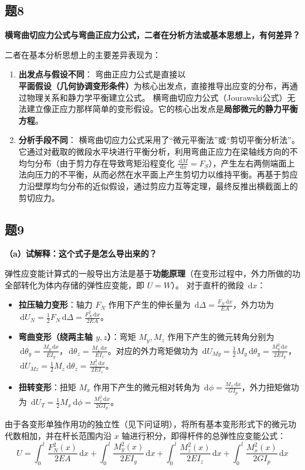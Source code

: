 \documentclass[UTF8,fontset=windows]{ctexart}
\newcommand{\diff}{\,\mathrm{d}}
\begin{document}
\subsection*{题8}
\textbf{横弯曲切应力公式与弯曲正应力公式，二者在分析方法或基本思想上，有何差异？}

二者在基本分析思想上的主要差异表现为：
\begin{enumerate}
    \item \textbf{出发点与假设不同}：
          弯曲正应力公式是直接以\textbf{平面假设（几何协调变形条件）}为核心出发点，直接推导出应变的分布，再通过物理关系和静力学平衡建立公式。
          横弯曲切应力公式（Jourawski公式）无法建立像正应力那样简单的变形假设。它的核心出发点是\textbf{局部微元的静力平衡方程}。
    \item \textbf{分析手段不同}：
          横弯曲切应力公式采用了“微元平衡法”或“剪切平衡分析法”。它通过对截取的微段水平块进行平衡分析，利用弯曲正应力在梁轴线方向的不均匀分布（由于剪力存在导致弯矩沿程变化 $\frac{\diff M}{\diff x} = F_S$），产生左右两侧端面上法向压力的不平衡，从而必然在水平面上产生剪切力以维持平衡。再基于剪应力沿壁厚均匀分布的近似假设，通过剪应力互等定理，最终反推出横截面上的剪切应力。
\end{enumerate}

\subsection*{题9}
\textbf{（a）试解释：这个式子是怎么导出来的？}

弹性应变能计算式的一般导出方法是基于\textbf{功能原理}（在变形过程中，外力所做的功全部转化为体内存储的弹性应变能，即 $U = W$）。
对于直杆的微段 $\diff x$：
\begin{itemize}
    \item \textbf{拉压轴力变形}：轴力 $F_N$ 作用下产生的伸长量为 $\diff \Delta = \frac{F_N \diff x}{EA}$，外力功为 $\diff U_N = \frac{1}{2} F_N \diff \Delta = \frac{F_N^2 \diff x}{2EA}$。
    \item \textbf{弯曲变形（绕两主轴 $y, z$）}：弯矩 $M_y, M_z$ 作用下产生的微元转角分别为 $\diff \theta_y = \frac{M_y \diff x}{EI_y}$，$\diff \theta_z = \frac{M_z \diff x}{EI_z}$。对应的外力弯矩做功为 $\diff U_{My} = \frac{1}{2} M_y \diff \theta_y = \frac{M_y^2 \diff x}{2EI_y}$，$\diff U_{Mz} = \frac{1}{2} M_z \diff \theta_z = \frac{M_z^2 \diff x}{2EI_z}$。
    \item \textbf{扭转变形}：扭矩 $M_x$ 作用下产生的微元相对转角为 $\diff \phi = \frac{M_x \diff x}{GI_p}$，外力扭矩做功为 $\diff U_T = \frac{1}{2} M_x \diff \phi = \frac{M_x^2 \diff x}{2GI_p}$。
\end{itemize}
由于各变形单独作用功的独立性（见下问证明），将所有基本变形形式下的微元功代数相加，并在杆长范围内沿 $x$ 轴进行积分，即得杆件的总弹性应变能公式：
\[
    U = \int_0^l \frac{F_N^2(x)}{2EA} \diff x + \int_0^l \frac{M_y^2(x)}{2EI_y} \diff x + \int_0^l \frac{M_z^2(x)}{2EI_z} \diff x + \int_0^l \frac{M_x^2(x)}{2GI_p} \diff x
\]
\end{document}
